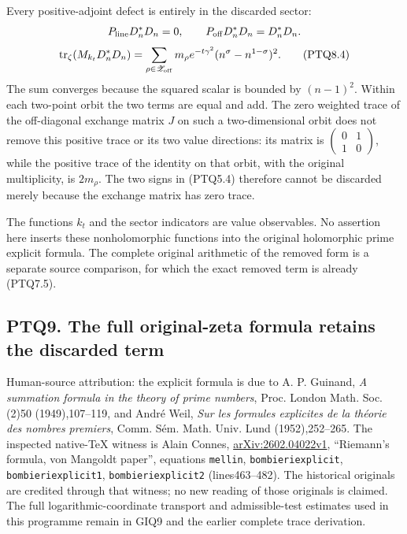 Every positive-adjoint defect is entirely in the discarded sector: \[
P_{\rm line}D_n^*D_n=0,
\qquad P_{\rm off}D_n^*D_n=D_n^*D_n.
\] \[
\operatorname{tr}_\zeta(M_{k_t}D_n^*D_n)
=\sum_{\rho\in\mathscr Z_{\rm off}}
m_\rho e^{-t\gamma^2}(n^\sigma-n^{1-\sigma})^2.
\tag{PTQ8.4}
\] The sum converges because the squared scalar is bounded by
\((n-1)^2\). Within each two-point orbit the two terms are equal and
add. The zero weighted trace of the off-diagonal exchange matrix \(J\)
on such a two-dimensional orbit does not remove this positive trace or
its two value directions: its matrix is
\(\begin{pmatrix}0&1\\1&0\end{pmatrix}\), while the positive trace of
the identity on that orbit, with the original multiplicity, is
\(2m_\rho\). The two signs in (PTQ5.4) therefore cannot be discarded
merely because the exchange matrix has zero trace.

The functions \(k_t\) and the sector indicators are value observables.
No assertion here inserts these nonholomorphic functions into the
original holomorphic prime explicit formula. The complete original
arithmetic of the removed form is a separate source comparison, for
which the exact removed term is already (PTQ7.5).

\subsection{PTQ9. The full original-zeta formula retains the discarded
term}\label{ptq9.-the-full-original-zeta-formula-retains-the-discarded-term}

Human-source attribution: the explicit formula is due to A. P. Guinand,
\emph{A summation formula in the theory of prime numbers}, Proc. London
Math. Soc. (2)50 (1949),107--119, and André Weil, \emph{Sur les formules
explicites de la théorie des nombres premiers}, Comm. Sém. Math. Univ.
Lund (1952),252--265. The inspected native-TeX witness is Alain Connes,
\href{https://arxiv.org/abs/2602.04022v1}{arXiv:2602.04022v1},
``Riemann's formula, von Mangoldt paper'', equations \texttt{mellin},
\texttt{bombieriexplicit}, \texttt{bombieriexplicit1},
\texttt{bombieriexplicit2} (lines463--482). The historical originals are
credited through that witness; no new reading of those originals is
claimed. The full logarithmic-coordinate transport and admissible-test
estimates used in this programme remain in GIQ9 and the earlier complete
trace derivation.

